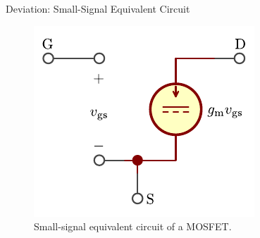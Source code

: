 \begin{frame}{Deviation: Small-Signal Equivalent Circuit}
    \begin{figure}
        \centering
        \includegraphics{../assets/small_signal.pdf}
        \caption{Small-signal equivalent circuit of a MOSFET.}
        \label{fig:mosfet_small_signal_model}
    \end{figure}
\end{frame}